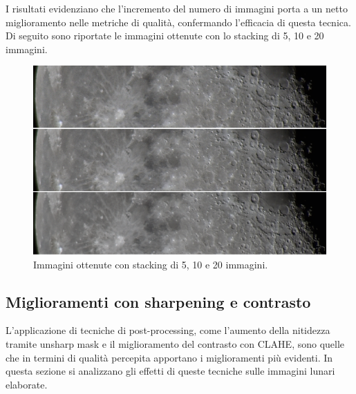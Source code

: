 \begin{figure}[H]
\end{figure}

I risultati evidenziano che l'incremento del numero di immagini porta a un netto miglioramento nelle metriche di qualità, confermando l'efficacia di questa tecnica. Di seguito sono riportate le immagini ottenute con lo stacking di 5, 10 e 20 immagini.

\begin{figure}[H]
    \centering
    \includegraphics[width = \linewidth]{../assets/n_stack_img.png}
    \caption{Immagini ottenute con stacking di 5, 10 e 20 immagini.}
    \label{fig:n_stack_img}
\end{figure}

\subsection{Miglioramenti con sharpening e contrasto} \label{subsec:analysis_post}

L'applicazione di tecniche di post-processing, come l'aumento della nitidezza tramite unsharp mask e il miglioramento del contrasto con CLAHE, sono quelle che in termini di qualità percepita apportano i miglioramenti più evidenti. In questa sezione si analizzano gli effetti di queste tecniche sulle immagini lunari elaborate.

